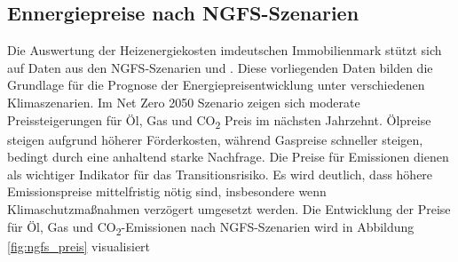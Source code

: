 \subsection{Ennergiepreise nach NGFS-Szenarien}\label{sec:ngfs_preis}
Die Auswertung der Heizenergiekosten imdeutschen Immobilienmark  stützt sich auf Daten aus den \ac{NGFS}-Szenarien und \textcite{imf2022}. Diese vorliegenden Daten bilden die Grundlage für die Prognose der Energiepreisentwicklung unter verschiedenen Klimaszenarien. Im Net Zero 2050 Szenario zeigen sich moderate Preissteigerungen für Öl, Gas und CO\textsubscript{2} Preis im nächsten Jahrzehnt. Ölpreise steigen aufgrund höherer Förderkosten, während Gaspreise schneller steigen, bedingt durch eine anhaltend starke Nachfrage. Die Preise für Emissionen dienen als wichtiger Indikator für das Transitionsrisiko. Es wird deutlich, dass höhere Emissionspreise mittelfristig nötig sind, insbesondere wenn Klimaschutzmaßnahmen verzögert umgesetzt werden.
Die Entwicklung der Preise für Öl, Gas und CO\textsubscript{2}-Emissionen nach NGFS-Szenarien wird in Abbildung \ref{fig:ngfs_preis} visualisiert
